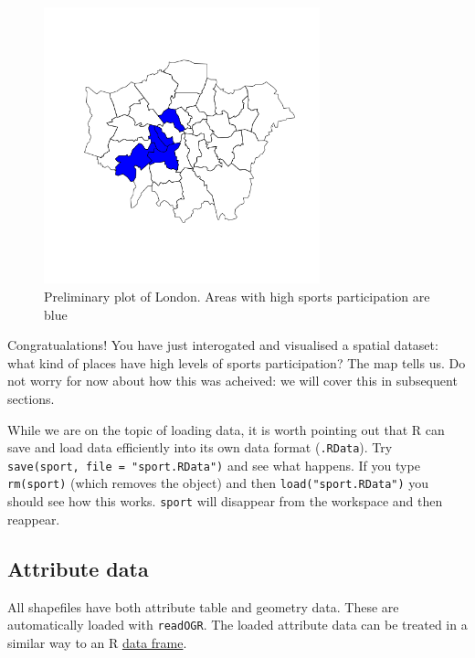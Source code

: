 \documentclass[]{article}
\let\Oldincludegraphics\includegraphics
\renewcommand{\includegraphics}[1]{\Oldincludegraphics[width=8cm]{#1}}
\begin{document}
\begin{figure}[htbp]
\centering
\includegraphics{figure/Preliminary_plot_of_London__Areas_with_high_sports_participation_are_blue.png}
\caption{Preliminary plot of London. Areas with high
sports participation are blue}
\end{figure}

Congratualations! You have just interogated and visualised a spatial
dataset: what kind of places have high levels of sports participation?
The map tells us. Do not worry for now about how this was acheived: we
will cover this in subsequent sections.

While we are on the topic of loading data, it is worth pointing out that
R can save and load data efficiently into its own data format
(\texttt{.RData}). Try \texttt{save(sport, file = "sport.RData")} and
see what happens. If you type \texttt{rm(sport)} (which removes the
object) and then \texttt{load("sport.RData")} you should see how this
works. \texttt{sport} will disappear from the workspace and then
reappear.

\subsection{Attribute data}

All shapefiles have both attribute table and geometry data. These are
automatically loaded with \texttt{readOGR}. The loaded attribute data
can be treated in a similar way to an R
\href{http://www.statmethods.net/input/datatypes.html}{data frame}.
\end{document}
